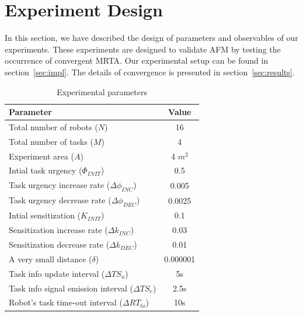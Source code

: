 \documentclass{llncs}
\begin{document}
\section{Experiment Design}
\label{sec:expt-design}
In this section, we have described the design of parameters and observables of our experiments.
These experiments are designed to validate AFM by testing the occurrence of convergent MRTA. Our experimental setup can be found in section~\ref{sec:impl}. The details of convergence is presented in section~\ref{sec:results}.
%
\begin{table}
\caption{Experimental parameters}
\label{table:params}
\begin{center}
\begin{tabular}{|l||c|}
\hline Parameter & Value\\
\hline Total number of robots ($N$) & 16\\
\hline Total number of tasks ($M$) & 4\\
\hline Experiment area ($A$) & 4 $m^2$\\
\hline Intial task urgency ($\Phi_{INIT}$) & 0.5\\
\hline Task urgency increase rate ($\Delta\phi_{INC}$) & 0.005\\
\hline Task urgency decrease rate ($\Delta\phi_{DEC}$) & 0.0025\\
\hline Intial sensitization ($K_{INIT}$) & 0.1\\
\hline Sensitization increase rate ($\Delta k_{INC}$) & 0.03\\
\hline Sensitization decrease rate ($\Delta k_{DEC}$) & 0.01\\
\hline A very small distance ($\delta$)& 0.000001\\
\hline Task info update interval ($\Delta TS_{u}$) & 5s\\
\hline Task info signal emission interval ($ \Delta TS_{e}$)& 2.5s\\
\hline Robot's task time-out interval ($\Delta RT_{to} $)& 10s\\
\hline
\end{tabular}
\end{center}
\end{table}
% 
\end{document}
